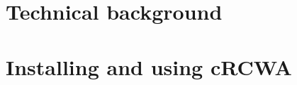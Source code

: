 \documentclass[10pt, a4paper]{book}
\newcommand{\afmm}{\textsf{cRCWA}}
\begin{document}
\chapter{Technical background}
\label{chap_implementation}


\chapter[Using \afmm]{Installing and using \afmm}
\label{chap_using}


\appendix



{} 

\end{document}
